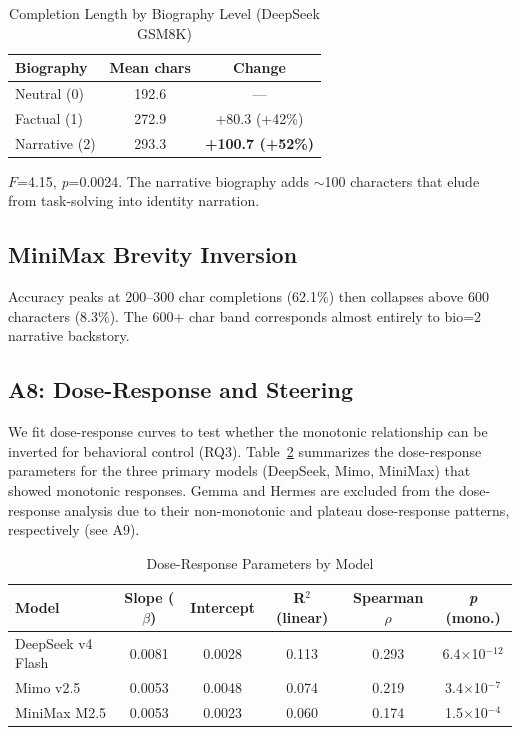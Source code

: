 \documentclass[11pt,a4paper]{article}
\begin{document}
\begin{table}[H]
\centering
\caption{Completion Length by Biography Level (DeepSeek GSM8K)}
\label{tab:length}
\begin{tabular}{lcc}
\toprule
\textbf{Biography} & \textbf{Mean chars} & \textbf{Change} \\
\midrule
Neutral (0) & 192.6 & --- \\
Factual (1) & 272.9 & +80.3 (+42\%) \\
Narrative (2) & 293.3 & \textbf{+100.7 (+52\%)} \\
\bottomrule
\end{tabular}
\end{table}

$F$=4.15, \textit{p}=0.0024. The narrative biography adds $\sim$100 characters that elude from task-solving into identity narration.

\subsection{MiniMax Brevity Inversion}

Accuracy peaks at 200--300 char completions (62.1\%) then collapses above 600 characters (8.3\%). The 600+ char band corresponds almost entirely to bio=2 narrative backstory.

\subsection{A8: Dose-Response and Steering}
\label{sec:a8}

We fit dose-response curves to test whether the monotonic relationship can be inverted for behavioral control (RQ3). Table~\ref{tab:dose_response} summarizes the dose-response parameters for the three primary models (DeepSeek, Mimo, MiniMax) that showed monotonic responses. Gemma and Hermes are excluded from the dose-response analysis due to their non-monotonic and plateau dose-response patterns, respectively (see A9).

\begin{table}[H]
\centering
\caption{Dose-Response Parameters by Model}
\label{tab:dose_response}
\begin{tabular}{lccccc}
\toprule
\textbf{Model} & \textbf{Slope ($\beta$)} & \textbf{Intercept} & \textbf{R$^2$ (linear)} & \textbf{Spearman $\rho$} & \textbf{\textit{p} (mono.)} \\
\midrule
DeepSeek v4 Flash & 0.0081 & 0.0028 & 0.113 & 0.293 & 6.4$\times$10$^{-12}$ \\
Mimo v2.5 & 0.0053 & 0.0048 & 0.074 & 0.219 & 3.4$\times$10$^{-7}$ \\
MiniMax M2.5 & 0.0053 & 0.0023 & 0.060 & 0.174 & 1.5$\times$10$^{-4}$ \\
\bottomrule
\end{tabular}
\end{table}
\end{document}
